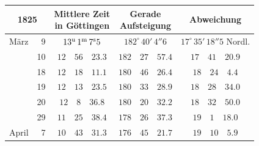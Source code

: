 \begin{center}
\begingroup\small\setlength{\tabcolsep}{4pt}
\begin{tabular}{lr|c|c|c}
\multicolumn{2}{c|}{1825} & \shortstack{Mittlere Zeit\\in Göttingen} & \shortstack{Gerade\\Aufsteigung} & Abweichung \\
\hline
März & 9 & $13^{\rm u}\,1^{\rm m}\,7^{\rm s}5$ & $182^{\circ}\,40'\,4''6$ & $17^{\circ}\,35'\,18''5$ Nordl. \\
 & 10 & $12\quad56\quad23.3$ & $182\quad27\quad57.4$ & $17\quad41\quad20.9$ \\
 & 18 & $12\quad18\quad11.1$ & $180\quad46\quad26.4$ & $18\quad24\quad4.4$ \\
 & 19 & $12\quad13\quad23.5$ & $180\quad33\quad28.9$ & $18\quad28\quad34.0$ \\
 & 20 & $12\quad8\quad36.8$ & $180\quad20\quad32.2$ & $18\quad32\quad50.0$ \\
 & 29 & $11\quad25\quad38.4$ & $178\quad26\quad37.3$ & $19\quad1\quad18.0$ \\
April & 7 & $10\quad43\quad31.3$ & $176\quad45\quad21.7$ & $19\quad10\quad5.9$ \\
\end{tabular}
\endgroup
\end{center}
